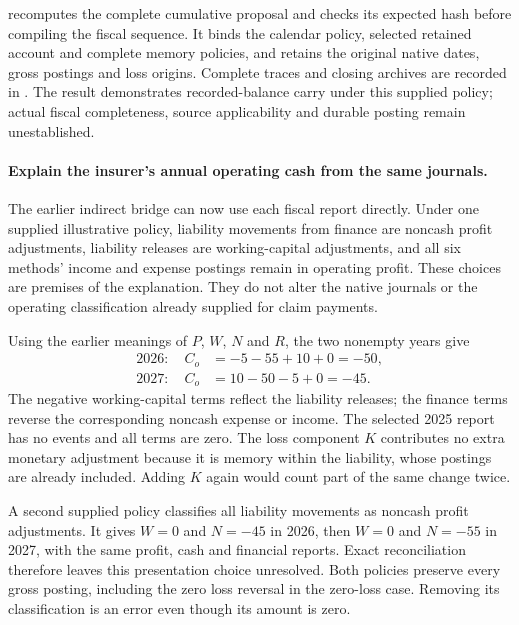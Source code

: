  recomputes the complete cumulative proposal and
checks its expected hash before compiling the fiscal sequence. It binds the
calendar policy, selected retained account and complete memory policies, and
retains the original native dates, gross postings and loss origins. Complete
traces and closing archives are recorded in
.
The result demonstrates recorded-balance carry under this supplied policy;
actual fiscal completeness, source applicability and durable posting remain
unestablished.


\paragraph{Explain the insurer's annual operating cash from the same journals.}
The earlier indirect bridge can now use each fiscal report directly. Under one
supplied illustrative policy, liability movements from finance are noncash
profit adjustments, liability releases are working-capital adjustments, and
all six methods' income and expense postings remain in operating profit.
These choices are premises of the explanation. They do not alter the native
journals or the operating classification already supplied for claim payments.

Using the earlier meanings of $P$, $W$, $N$ and $R$, the two nonempty years give
\[
\begin{aligned}
  2026:\quad C_o&=-5-55+10+0=-50,\\
  2027:\quad C_o&=10-50-5+0=-45.
\end{aligned}
\]
The negative working-capital terms reflect the liability releases; the finance
terms reverse the corresponding noncash expense or income. The selected 2025
report has no events and all terms are zero. The loss component $K$ contributes
no extra monetary adjustment because it is memory within the liability,
whose postings are already included. Adding $K$ again would count part of the
same change twice.

A second supplied policy classifies all liability movements as noncash profit
adjustments. It gives $W=0$ and $N=-45$ in 2026, then $W=0$ and $N=-55$ in
2027, with the same profit, cash and financial reports. Exact reconciliation
therefore leaves this presentation choice unresolved. Both policies preserve
every gross posting, including the zero loss reversal in the zero-loss case.
Removing its classification is an error even though its amount is zero.

